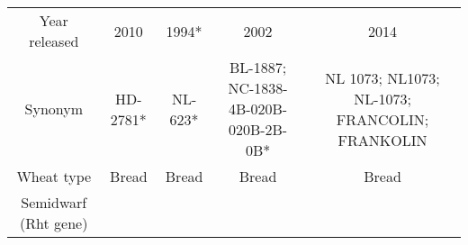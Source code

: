 \documentclass[]{article}
\begin{document}
\begin{longtable}[]{@{}ccccc@{}}
\begin{minipage}[t]{0.06\columnwidth}
Year released\strut
\end{minipage} & \begin{minipage}[t]{0.08\columnwidth}\centering\strut
2010\strut
\end{minipage} & \begin{minipage}[t]{0.11\columnwidth}\centering\strut
1994*\strut
\end{minipage} & \begin{minipage}[t]{0.08\columnwidth}\centering\strut
2002\strut
\end{minipage} & \begin{minipage}[t]{0.12\columnwidth}\centering\strut
2014\strut
\end{minipage}\tabularnewline
\begin{minipage}[t]{0.06\columnwidth}\centering\strut
Synonym\strut
\end{minipage} & \begin{minipage}[t]{0.08\columnwidth}\centering\strut
HD-2781*\strut
\end{minipage} & \begin{minipage}[t]{0.11\columnwidth}\centering\strut
NL-623*\strut
\end{minipage} & \begin{minipage}[t]{0.08\columnwidth}\centering\strut
BL-1887; NC-1838-4B-020B-020B-2B-0B*\strut
\end{minipage} & \begin{minipage}[t]{0.12\columnwidth}\centering\strut
NL 1073; NL1073; NL-1073; FRANCOLIN; FRANKOLIN\strut
\end{minipage}\tabularnewline
\begin{minipage}[t]{0.06\columnwidth}\centering\strut
Wheat type\strut
\end{minipage} & \begin{minipage}[t]{0.08\columnwidth}\centering\strut
Bread\strut
\end{minipage} & \begin{minipage}[t]{0.11\columnwidth}\centering\strut
Bread\strut
\end{minipage} & \begin{minipage}[t]{0.08\columnwidth}\centering\strut
Bread\strut
\end{minipage} & \begin{minipage}[t]{0.12\columnwidth}\centering\strut
Bread\strut
\end{minipage}\tabularnewline
\begin{minipage}[t]{0.06\columnwidth}\centering\strut
Semidwarf (Rht gene)\strut

\end{minipage}
\end{longtable}
\end{document}
